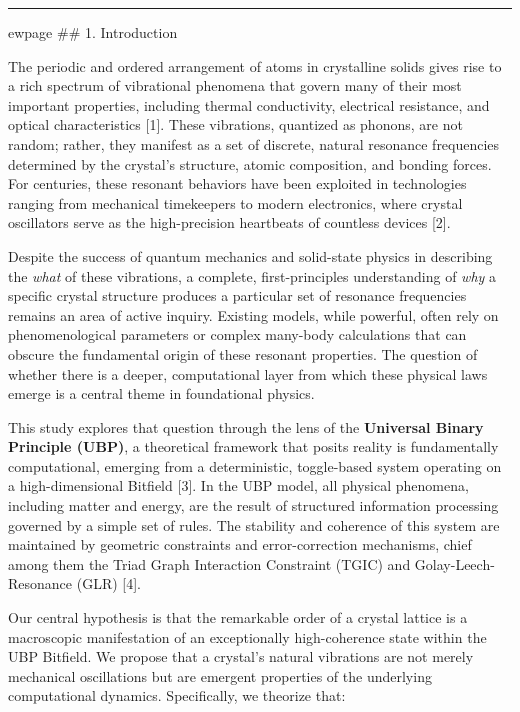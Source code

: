 \begin{center}\rule{0.5\linewidth}{0.5pt}\end{center}

ewpage \#\# 1. Introduction

The periodic and ordered arrangement of atoms in crystalline solids
gives rise to a rich spectrum of vibrational phenomena that govern many
of their most important properties, including thermal conductivity,
electrical resistance, and optical characteristics {[}1{]}. These
vibrations, quantized as phonons, are not random; rather, they manifest
as a set of discrete, natural resonance frequencies determined by the
crystal's structure, atomic composition, and bonding forces. For
centuries, these resonant behaviors have been exploited in technologies
ranging from mechanical timekeepers to modern electronics, where crystal
oscillators serve as the high-precision heartbeats of countless devices
{[}2{]}.

Despite the success of quantum mechanics and solid-state physics in
describing the \emph{what} of these vibrations, a complete,
first-principles understanding of \emph{why} a specific crystal
structure produces a particular set of resonance frequencies remains an
area of active inquiry. Existing models, while powerful, often rely on
phenomenological parameters or complex many-body calculations that can
obscure the fundamental origin of these resonant properties. The
question of whether there is a deeper, computational layer from which
these physical laws emerge is a central theme in foundational physics.

This study explores that question through the lens of the
\textbf{Universal Binary Principle (UBP)}, a theoretical framework that
posits reality is fundamentally computational, emerging from a
deterministic, toggle-based system operating on a high-dimensional
Bitfield {[}3{]}. In the UBP model, all physical phenomena, including
matter and energy, are the result of structured information processing
governed by a simple set of rules. The stability and coherence of this
system are maintained by geometric constraints and error-correction
mechanisms, chief among them the Triad Graph Interaction Constraint
(TGIC) and Golay-Leech-Resonance (GLR) {[}4{]}.

Our central hypothesis is that the remarkable order of a crystal lattice
is a macroscopic manifestation of an exceptionally high-coherence state
within the UBP Bitfield. We propose that a crystal's natural vibrations
are not merely mechanical oscillations but are emergent properties of
the underlying computational dynamics. Specifically, we theorize that:

